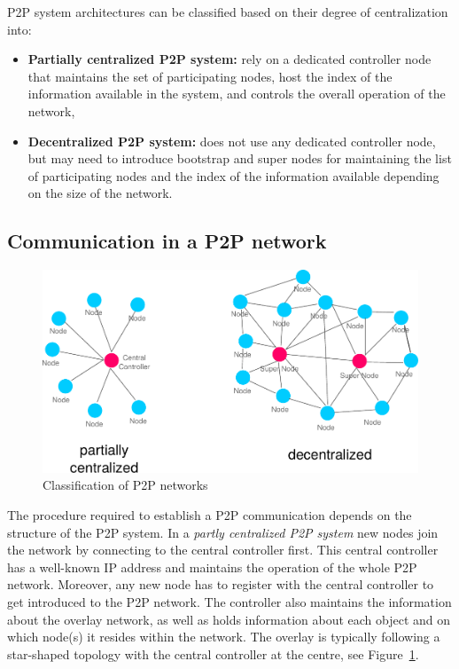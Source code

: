 \gls{P2P} system architectures can be classified based on their degree of centralization into: \@

\begin{itemize}
	\item \textbf{Partially centralized \gls{P2P} system:} rely on a dedicated controller node that maintains the set of participating nodes, host the index of the information available in the system, and controls the overall operation of the network,
	\item \textbf{Decentralized \gls{P2P} system:} does not use any dedicated controller node, but may need to introduce bootstrap and super nodes for maintaining the list of participating nodes and the index of the information available depending on the size of the network.
\end{itemize}


\subsection{Communication in a \gls{P2P} network}
\label{sec:p2p_start_communication}

\begin{figure}[!ht]
	\centering
	\includegraphics[width=0.8\columnwidth]{images/p2p_network_structures.pdf}
	\caption{Classification of \gls{P2P} networks}
	\label{fig:p2p_network_structures}
\end{figure}

The procedure required to establish a \gls{P2P} communication depends on the structure of the \gls{P2P} system. In a \emph{partly centralized \gls{P2P} system} new nodes join the network by connecting to the central controller first. This central controller has a well-known \gls{IP} address and maintains the operation of the whole \gls{P2P} network. Moreover, any new node has to register with the central controller to get introduced to the \gls{P2P} network. The controller also maintains the information about the overlay network, as well as holds information about each object and on which node(s) it resides within the network. The overlay is typically following a star-shaped topology with the central controller at the centre, see Figure~\ref{fig:p2p_network_structures}. \\

